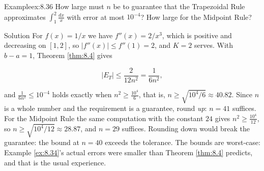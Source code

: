 \documentclass[a4paper,12pt,oneside]{memoir}
\begin{document}
\begin{workedexample}
\begin{envexample}{Example}{ex:8.36}{}
How large must \(n\) be to guarantee that the Trapezoidal Rule approximates \(\displaystyle\int_{1}^{2}\frac{dx}{x}\) with error at most \(10^{-4}\)? How large for the Midpoint Rule?
\end{envexample}
\begin{envsolution}{Solution}{}{}
For \(f(x) = 1/x\) we have \(f''(x) = 2/x^{3}\), which is positive and decreasing on \([1, 2]\), so \(\lvert f''(x)\rvert \le f''(1) = 2\), and \(K = 2\) serves. With \(b - a = 1\), Theorem \ref{thm:8.4} gives

\[ \lvert E_{T}\rvert \le \frac{2}{12 n^{2}} = \frac{1}{6 n^{2}}, \]

and \(\tfrac{1}{6n^{2}} \le 10^{-4}\) holds exactly when \(n^{2} \ge \tfrac{10^{4}}{6}\), that is, \(n \ge \sqrt{10^{4}/6} \approx 40.82\). Since \(n\) is a whole number and the requirement is a guarantee, round \emph{up}: \(n = 41\) suffices. For the Midpoint Rule the same computation with the constant \(24\) gives \(n^{2} \ge \tfrac{10^{4}}{12}\), so \(n \ge \sqrt{10^{4}/12} \approx 28.87\), and \(n = 29\) suffices. Rounding down would break the guarantee: the bound at \(n = 40\) exceeds the tolerance. The bounds are worst-case: Example \ref{ex:8.34}’s actual errors were smaller than Theorem \ref{thm:8.4} predicts, and that is the usual experience. \qedmark
\end{envsolution}
\end{workedexample}
\end{document}
